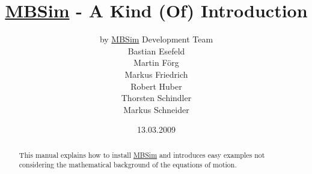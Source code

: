 \documentclass[a4,english]{AMpaper}
\newcommand{\MBSim}{\href{http://mbsim.berlios.de}{\textsf{MBSim}}}
\begin{document}
\title{\MBSim{} - A Kind (Of) Introduction}
\author{by \MBSim{} Development Team\\
  Bastian Esefeld\\
  Martin F\"org\\
  Markus Friedrich\\
  Robert Huber\\
  Thorsten Schindler\\
  Markus Schneider}
\date{13.03.2009}
\maketitle

\begin{abstract}
  This manual explains how to install \MBSim{} and introduces easy examples not considering the mathematical background of the equations of motion.
\end{abstract}

\noindent\hrulefill
\tableofcontents



%

%
%
%




\end{document}
